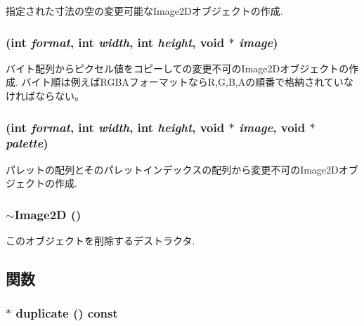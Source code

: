 指定された寸法の空の変更可能なImage2Dオブジェクトの作成. \hypertarget{classm3g_1_1Image2D_8cf9a47f24ed50fe66686c1117fb048c}{
\subsubsection[{Image2D}]{ (int {\em format}, \/  int {\em width}, \/  int {\em height}, \/  void $\ast$ {\em image})}}
\label{classm3g_1_1Image2D_8cf9a47f24ed50fe66686c1117fb048c}


バイト配列からピクセル値をコピーしての変更不可のImage2Dオブジェクトの作成. バイト順は例えばRGBAフォーマットならR,G,B,Aの順番で格納されていなければならない。 \hypertarget{classm3g_1_1Image2D_f498914ceac20ff9b1708c55ff1484e6}{
\subsubsection[{Image2D}]{ (int {\em format}, \/  int {\em width}, \/  int {\em height}, \/  void $\ast$ {\em image}, \/  void $\ast$ {\em palette})}}
\label{classm3g_1_1Image2D_f498914ceac20ff9b1708c55ff1484e6}


パレットの配列とそのパレットインデックスの配列から変更不可のImage2Dオブジェクトの作成. \hypertarget{classm3g_1_1Image2D_7ac703fe7edbb053dd2246ea1bb43200}{
\subsubsection[{$\sim$Image2D}]{\setlength{\rightskip}{0pt plus 5cm}$\sim${\bf Image2D} ()}}
\label{classm3g_1_1Image2D_7ac703fe7edbb053dd2246ea1bb43200}


このオブジェクトを削除するデストラクタ. 

\subsection{関数}
\hypertarget{classm3g_1_1Image2D_47eefc8e0b0b3d4c5b16b3f57285fe6b}{
\subsubsection[{duplicate}]{ $\ast$ duplicate () const}}
\label{classm3g_1_1Image2D_47eefc8e0b0b3d4c5b16b3f57285fe6b}


